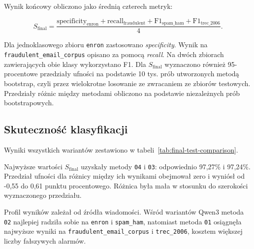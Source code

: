\begin{table}[htbp]
\centering
\small

\caption{Skład zbiorów wykorzystanych w teście końcowym.}
\label{tab:final-test-sets}
\end{table}

Wynik końcowy obliczono jako średnią czterech metryk:

\begin{equation}
S_{\mathrm{final}} =
\frac{
    \mathrm{specificity}_{\mathrm{enron}} +
    \mathrm{recall}_{\mathrm{fraudulent}} +
    \mathrm{F1}_{\mathrm{spam\_ham}} +
    \mathrm{F1}_{\mathrm{trec\_2006}}
}{4}.
\end{equation}

Dla jednoklasowego zbioru \texttt{enron} zastosowano \emph{specificity}.
Wynik na \texttt{fraudulent\_\allowbreak email\_\allowbreak corpus} opisano za pomocą \emph{recall}.
Na dwóch zbiorach zawierających obie klasy wykorzystano F1. Dla
\(S_{\mathrm{final}}\) wyznaczono również 95-procentowe przedziały ufności na
podstawie 10 tys. prób utworzonych metodą bootstrap, czyli przez wielokrotne
losowanie ze zwracaniem ze zbiorów testowych. Przedziały różnic między metodami
obliczono na podstawie niezależnych prób bootstrapowych.

\subsection{Skuteczność klasyfikacji}

Wyniki wszystkich wariantów zestawiono w
tabeli~\ref{tab:final-test-comparison}.

\begin{table}[htbp]
\centering
\scriptsize
\resizebox{\textwidth}{!}{}
\caption{Wyniki testu końcowego. Przedziały ufności dotyczą
\(S_{\mathrm{final}}\).}
\label{tab:final-test-comparison}
\end{table}

Najwyższe wartości \(S_{\mathrm{final}}\) uzyskały metody \texttt{04} i
\texttt{03}: odpowiednio 97,27\% i 97,24\%. Przedział ufności dla różnicy
między ich wynikami obejmował zero i wyniósł od -0,55 do 0,61 punktu
procentowego. Różnica była mała w stosunku do szerokości wyznaczonego przedziału.

Profil wyników zależał od źródła wiadomości. Wśród wariantów Qwen3 metoda
\texttt{02} najlepiej radziła sobie na \texttt{enron} i \texttt{spam\_ham}, natomiast metoda
\texttt{01} osiągnęła najwyższe wyniki na
\texttt{fraudulent\_email\_corpus} i \texttt{trec\_2006}, kosztem większej
liczby fałszywych alarmów.

